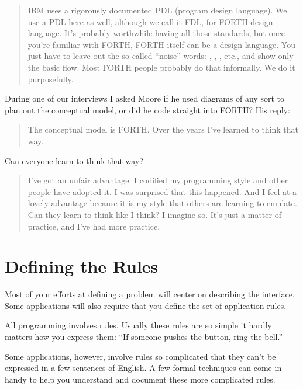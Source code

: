 \begin{quotation}
\noindent IBM uses a rigorously documented PDL (program design
language). We use a PDL here as well, although we call it FDL, for
FORTH design language. It's probably worthwhile having all those
standards, but once you're familiar with FORTH, FORTH itself can be a
design language. You just have to leave out the so-called ``noise''
words: , , , etc., and show only the
basic flow. Most FORTH people probably do that informally. We do it
purposefully.

\end{quotation}
\blackline{2ex}


\noindent During one of our interviews I asked Moore if he used
diagrams of any sort to plan out the conceptual model, or did he code
straight into FORTH? His reply:

\begin{quotation}
\noindent The conceptual model is FORTH. Over the years I've learned to think that way.
\end{quotation}

\noindent Can everyone learn to think that way?

\begin{quotation}
\noindent I've got an unfair advantage. I codified my programming style and other
people have adopted it. I was surprised that this happened. And I feel at a
lovely advantage because it is my style that others are learning to emulate.
Can they learn to think like I think? I imagine so. It's just a matter of
practice, and I've had more practice.
\end{quotation}
\blackline{2ex}

\section{Defining the Rules}

\noindent Most of your efforts at defining a problem will center on describing the
interface. Some applications will also require that you define the set of
application rules.

All programming involves rules. Usually these rules are so simple it
hardly matters how you express them: ``If someone pushes the button,
ring the bell.''

Some applications, however, involve rules so complicated that they
can't be expressed in a few sentences of English. A few formal techniques
can come in handy to help you understand and document these more
complicated rules.

